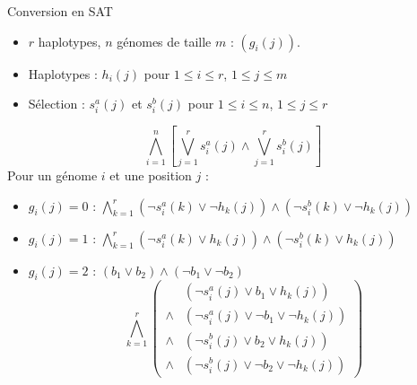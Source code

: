 \documentclass{beamer}
\begin{document}
\begin{frame}
    \begin{block}{Conversion en SAT}
        \begin{itemize}
            \item $r$ haplotypes, $n$ génomes de taille $m$ : $(g_i(j))$.
            \item Haplotypes : $h_i(j)$ pour $1\leq i\leq r$, $1\leq j\leq m$
            \item Sélection : $s^a_i(j)$ et $s^b_i(j)$ pour $1\leq i\leq n$, $1\leq j\leq r$
        \end{itemize}
        \[ \bigwedge_{i=1}^n\left[\bigvee_{j=1}^r s^a_i(j) \wedge \bigvee_{j=1}^r s^b_i(j)\right] \]
        Pour un génome $i$ et une position $j$ : \begin{itemize}
            \item $g_i(j) = 0$ : $\bigwedge_{k=1}^r (\neg s^a_i(k)\vee \neg h_k(j)) \wedge (\neg s^b_i(k)\vee \neg h_k(j))$
            \item $g_i(j) = 1$ : $\bigwedge_{k=1}^r (\neg s^a_i(k)\vee h_k(j)) \wedge (\neg s^b_i(k)\vee h_k(j))$
            \item $g_i(j) = 2$ : $(b_1\vee b_2) \wedge (\neg b_1\vee \neg b_2)$
                \[\bigwedge_{k=1}^r \left(\begin{array}{cl}
                            & (\neg s^a_i(j)\vee b_1 \vee h_k(j)) \\
                     \wedge & (\neg s^a_i(j)\vee \neg b_1\vee \neg h_k(j)) \\
                     \wedge & (\neg s^b_i(j)\vee b_2 \vee h_k(j)) \\
                     \wedge & (\neg s^b_i(j)\vee \neg b_2 \vee \neg h_k(j))
                \end{array}\right)\]
        \end{itemize}
    \end{block}

\end{frame}
\end{document}
